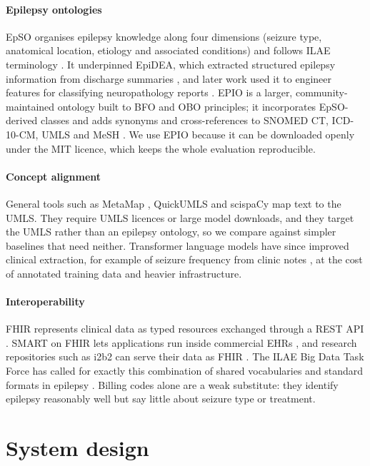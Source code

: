 \documentclass[preprint,12pt]{elsarticle}
\begin{document}
\paragraph{Epilepsy ontologies} EpSO organises epilepsy knowledge along four dimensions (seizure type, anatomical location, etiology and associated conditions) and follows ILAE terminology \cite{sahoo2014}. It underpinned EpiDEA, which extracted structured epilepsy information from discharge summaries \cite{cui2012}, and later work used it to engineer features for classifying neuropathology reports \cite{sahoo2022}. EPIO is a larger, community-maintained ontology built to BFO and OBO principles; it incorporates EpSO-derived classes and adds synonyms and cross-references to SNOMED CT, ICD-10-CM, UMLS and MeSH \cite{sargsyan2023}. We use EPIO because it can be downloaded openly under the MIT licence, which keeps the whole evaluation reproducible.

\paragraph{Concept alignment} General tools such as MetaMap \cite{aronson2001}, QuickUMLS \cite{soldaini2016} and scispaCy \cite{neumann2019} map text to the UMLS. They require UMLS licences or large model downloads, and they target the UMLS rather than an epilepsy ontology, so we compare against simpler baselines that need neither. Transformer language models have since improved clinical extraction, for example of seizure frequency from clinic notes \cite{xie2022}, at the cost of annotated training data and heavier infrastructure.

\paragraph{Interoperability} FHIR represents clinical data as typed resources exchanged through a REST API \cite{fhir,braunstein2018}. SMART on FHIR lets applications run inside commercial EHRs \cite{mandel2016}, and research repositories such as i2b2 can serve their data as FHIR \cite{wagholikar2017}. The ILAE Big Data Task Force has called for exactly this combination of shared vocabularies and standard formats in epilepsy \cite{lhatoo2020}. Billing codes alone are a weak substitute: they identify epilepsy reasonably well \cite{jette2010} but say little about seizure type or treatment.

\section{System design}
\label{sec:design}
\end{document}
